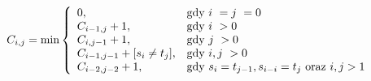 \documentclass{praca1}
\begin{document}
\begin{equation}
\label{eq:007}
C_{i,j} = \min\left\{
\begin{array}{l l}     
    0, & \text{gdy } i~= j~= 0\\
    C_{i-1, j} + 1, & \text{gdy } i~> 0 \\
    C_{i, j-1} + 1, & \text{gdy } j~> 0 \\
    C_{i-1, j-1} + [s_{i}\neq t_{j}], & \text{gdy } i, j~> 0 \\
    C_{i-2, j-2} + 1, & \text{gdy } s_i = t_{j-1}, s_{i-i} = t_j \text{ oraz } i,j > 1
\end{array}\right.
\end{equation}


%

\end{document}
